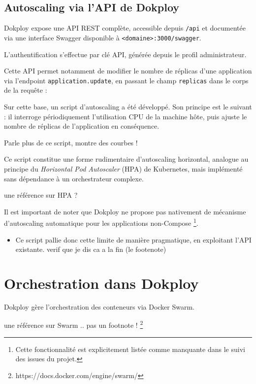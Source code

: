 \documentclass{rapportClass} %
\begin{document}
\subsection{Autoscaling via l'API de Dokploy}
\label{sec:autoscaling}

Dokploy expose une API REST complète, accessible depuis
\texttt{/api} et documentée via une interface Swagger disponible
à \texttt{<domaine>:3000/swagger}.

L'authentification s'effectue par clé API, générée depuis le profil
administrateur.

\smallskip
Cette API permet notamment de modifier le nombre de réplicas d'une
application via l'endpoint \texttt{application.update}, en passant
le champ \texttt{replicas} dans le corps de la requête :

\smallskip
Sur cette base, un script d'autoscaling a été développé. Son
principe est le suivant : il interroge périodiquement l'utilisation
CPU de la machine hôte, puis ajuste le nombre de réplicas de
l'application en conséquence.

{\color{red} Parle plus de ce script, montre des courbes !}

\smallskip
Ce script constitue une forme rudimentaire d'autoscaling horizontal,
analogue au principe du \textit{Horizontal Pod Autoscaler} (HPA) de
Kubernetes, mais implémenté sans dépendance à un orchestrateur
complexe.

{\color{red} une référence sur HPA ? }

\smallskip

Il est important de noter que Dokploy ne propose pas nativement de
mécanisme d'autoscaling automatique pour les applications non-Compose
\footnote{Cette fonctionnalité est explicitement listée comme manquante
  dans le suivi des issues du projet.}.
\begin{itemize}
\item Ce script pallie donc cette limite de manière pragmatique, en
  exploitant l'API existante.  {\color{blue} verif que je dis ca a la
    fin (le footenote)}
\end{itemize}


\section{Orchestration dans Dokploy}
Dokploy gère l'orchestration des conteneurs via Docker Swarm.

{\color{red} une référence sur Swarm .. pas un footnote !}
\footnote{https://docs.docker.com/engine/swarm/}
\end{document}
